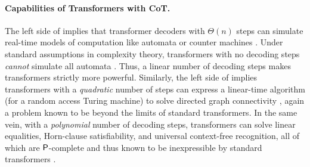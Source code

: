 \documentclass{article} %
\begin{document}
\paragraph{Capabilities of Transformers with CoT.} The left side of  implies that transformer decoders with $\Theta(n)$ steps can simulate real-time models of computation like automata or counter machines \citep{merrill2021linguistic}. Under standard assumptions in complexity theory, transformers with no decoding steps \emph{cannot} simulate all automata \citep{merrill2023parallelism,merrill23icgi,liu2023transformers}. Thus, a linear number of decoding steps makes transformers strictly more powerful. Similarly, the left side of  implies transformers with a \emph{quadratic} number of steps can express a linear-time algorithm (for a random access Turing machine) to solve directed graph connectivity \citep{wigderson1992complexity}, again a problem known to be beyond the limits of standard transformers.
In the same vein, with a \emph{polynomial} number of decoding steps, transformers can solve linear equalities, Horn-clause satisfiability, and universal context-free recognition, all of which are $\P$-complete and thus known to be inexpressible by standard transformers \citep{merrill2023parallelism}.
\end{document}
